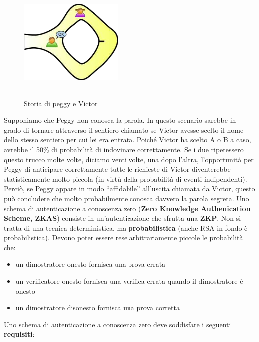 \begin{figure}[htbp]
	\centering%
	\subfigure%
	{\includegraphics[height=5cm, width=5cm, keepaspectratio]{Immagini/chiave_pubblica/peggy_victor_3.png}}
	\caption{Storia di peggy e Victor\label{fig:peggy_victor_3}}
\end{figure}
Supponiamo che Peggy non conosca la parola. In questo scenario sarebbe in grado di tornare attraverso il sentiero chiamato se Victor avesse scelto il nome dello stesso sentiero per cui lei era entrata. Poiché Victor ha scelto A o B a caso, avrebbe il 50\% di probabilità di indovinare correttamente. Se i due ripetessero questo trucco molte volte, diciamo venti volte, una dopo l'altra, l'opportunità per Peggy di anticipare correttamente tutte le richieste di Victor diventerebbe statisticamente molto piccola (in virtù della probabilità di eventi indipendenti). Perciò, se Peggy appare in modo “affidabile” all'uscita
chiamata da Victor, questo può concludere che molto probabilmente conosca davvero la parola segreta.
\newline \newline
Uno schema di autenticazione a conoscenza zero (\textbf{Zero Knowledge Authenication Scheme, ZKAS}) consiste in un'autenticazione che sfrutta una \textbf{ZKP}. Non si tratta di una tecnica deterministica, ma \textbf{probabilistica} (anche RSA in fondo è probabilistica). Devono poter essere rese arbitrariamente piccole le probabilità che:
\begin{itemize}
\item un dimostratore onesto fornisca una prova errata
\item un verificatore onesto fornisca una verifica errata quando il dimostratore è onesto
\item un dimostratore disonesto fornisca una prova corretta
\end{itemize} 
Uno schema di autenticazione a conoscenza zero deve soddisfare i seguenti \textbf{requisiti}: 
